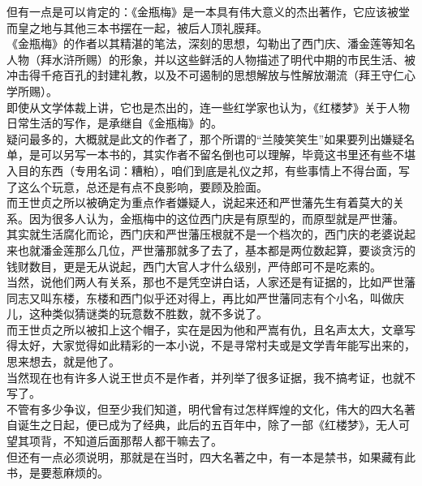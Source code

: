 \begin{multicols}{\theparacolNo}
但有一点是可以肯定的：《金瓶梅》是一本具有伟大意义的杰出著作，它应该被堂而皇之地与其他三本书摆在一起，被后人顶礼膜拜。\\

《金瓶梅》的作者以其精湛的笔法，深刻的思想，勾勒出了西门庆、潘金莲等知名人物（拜水浒所赐）的形象，并以这些鲜活的人物描述了明代中期的市民生活、被冲击得千疮百孔的封建礼教，以及不可遏制的思想解放与性解放潮流（拜王守仁心学所赐）。\\

即使从文学体裁上讲，它也是杰出的，连一些红学家也认为，《红楼梦》关于人物日常生活的写作，是承继自《金瓶梅》的。\\

疑问最多的，大概就是此文的作者了，那个所谓的“兰陵笑笑生”如果要列出嫌疑名单，是可以另写一本书的，其实作者不留名倒也可以理解，毕竟这书里还有些不堪入目的东西（专用名词：糟粕），咱们到底是礼仪之邦，有些事情上不得台面，写了这么个玩意，总还是有点不良影响，要顾及脸面。\\

而王世贞之所以被确定为重点作者嫌疑人，说起来还和严世藩先生有着莫大的关系。因为很多人认为，金瓶梅中的这位西门庆是有原型的，而原型就是严世藩。\\

其实就生活腐化而论，西门庆和严世藩压根就不是一个档次的，西门庆的老婆说起来也就潘金莲那么几位，严世藩那就多了去了，基本都是两位数起算，要谈贪污的钱财数目，更是无从说起，西门大官人才什么级别，严侍郎可不是吃素的。\\

当然，说他们两人有关系，那也不是凭空讲白话，人家还是有证据的，比如严世藩同志又叫东楼，东楼和西门似乎还对得上，再比如严世藩同志有个小名，叫做庆儿，这种类似猜谜类的玩意数不胜数，就不多说了。\\

而王世贞之所以被扣上这个帽子，实在是因为他和严嵩有仇，且名声太大，文章写得太好，大家觉得如此精彩的一本小说，不是寻常村夫或是文学青年能写出来的，思来想去，就是他了。\\

当然现在也有许多人说王世贞不是作者，并列举了很多证据，我不搞考证，也就不写了。\\

不管有多少争议，但至少我们知道，明代曾有过怎样辉煌的文化，伟大的四大名著自诞生之日起，便已成为了经典，此后的五百年中，除了一部《红楼梦》，无人可望其项背，不知道后面那帮人都干嘛去了。\\

但还有一点必须说明，那就是在当时，四大名著之中，有一本是禁书，如果藏有此书，是要惹麻烦的。\\


\end{multicols}
